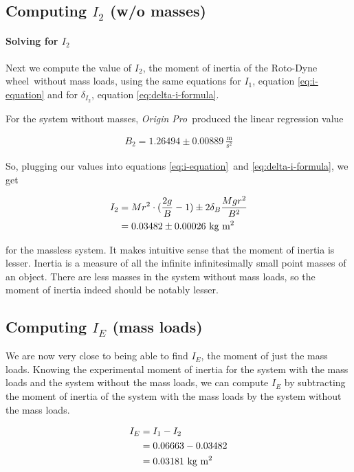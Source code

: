 \documentclass[coverpage]{article}
\newcommand{\softwareText}[1]{\textit{#1}\texttrademark}
\newcommand{\origin}{\softwareText{Origin Pro}}
\newcommand{\iUnit}{\text{kg $\text{m}^2$}}
\newcommand{\rwheel}{Roto-Dyne wheel}
\newcommand{\mpssq}{\frac{\text{m}}{\text{s}^2}}
\begin{document}
	\subsection{Computing $I_2$ (w/o masses)}
	
	\paragraph{Solving for $I_2$}
	
	Next we compute the value of $I_2$, the moment of inertia of the \rwheel~without mass loads, using the same equations for $I_1$, equation \ref{eq:i-equation} and for $\delta_{I_2}$, equation \ref{eq:delta-i-formula}.
	
	For the system without masses, \origin~produced the linear regression value
	
	\begin{align}
		B_2 = 1.26494 \pm 0.00889\ \mpssq \label{eq:def-b2}
	\end{align}
	
	So, plugging our values into equations \ref{eq:i-equation}~and \ref{eq:delta-i-formula}, we get
	
	\begin{align}
		I_2 &= Mr^2 \cdot (\frac{2g}{B} - 1) \pm 2 \delta_B \frac{M g r^2}{B^2} \notag \\
		&= 0.03482 \pm 0.00026\ \iUnit
	\end{align}

	for the massless system. It makes intuitive sense that the moment of inertia is lesser. Inertia is a measure of all the infinite infinitesimally small point masses of an object. There are less masses in the system without mass loads, so the moment of inertia indeed should be notably lesser.
	
	\subsection{Computing $I_E$ (mass loads)}
	
	We are now very close to being able to find $I_E$, the moment of just the mass loads. Knowing the experimental moment of inertia for the system with the mass loads and the system without the mass loads, we can compute $I_E$ by subtracting the moment of inertia of the system with the mass loads by the system without the mass loads.
	
	\begin{align}
		I_E &= I_1 - I_2 \label{eq:mass-load-i-only} \\
		&= 0.06663 - 0.03482 \notag \\
		&= 0.03181\ \iUnit
	\end{align}
	
\end{document}
